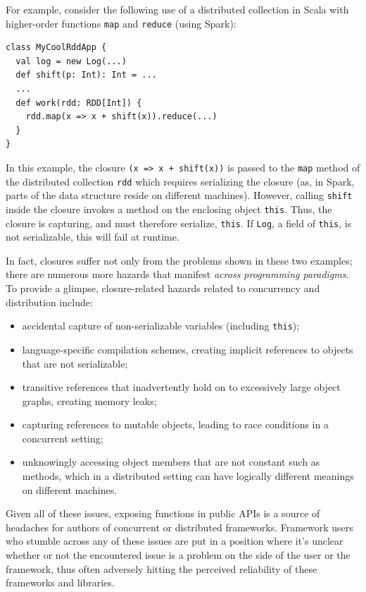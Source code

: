 \documentclass[runningheads]{llncs}
\begin{document}
\begin{sloppypar}
For example, consider the following use of a distributed collection in Scala
with higher-order functions \verb|map| and \verb|reduce| (using Spark):

\begin{lstlisting}
class MyCoolRddApp {
  val log = new Log(...)
  def shift(p: Int): Int = ...
  ...
  def work(rdd: RDD[Int]) {
    rdd.map(x => x + shift(x)).reduce(...)
  }
}
\end{lstlisting}
\noindent
In this example, the closure \verb|(x => x + shift(x))| is passed to the
\verb|map| method of the distributed collection \verb|rdd| which requires
serializing the closure (as, in Spark, parts of the data structure reside on
different machines). However, calling \verb|shift| inside the closure invokes
a method on the enclosing object \verb|this|. Thus, the closure is capturing,
and must therefore serialize, \verb|this|. If \verb|Log|, a field of
\verb|this|, is not serializable, this will fail at runtime.

In fact, closures suffer not only from the problems shown in these two
examples; there are numerous more hazards that manifest {\em across
programming paradigms}. To provide a glimpse, closure-related hazards
related to concurrency and distribution include:


\vspace{-2mm}
\begin{itemize}
\item accidental capture of non-serializable variables (including \verb|this|);
\item language-specific compilation schemes, creating implicit references to objects that are not serializable;
\item transitive references that inadvertently hold on to excessively large object graphs, creating memory leaks;
\item capturing references to mutable objects, leading to race conditions in a concurrent setting;
\item unknowingly accessing object members that are not constant such as methods, which in a distributed setting can have logically different meanings on different machines.
\end{itemize}

Given all of these issues, exposing functions in public APIs is a source of
headaches for authors of concurrent or distributed frameworks. Framework users
who stumble across any of these issues are put in a position where it's
unclear whether or not the encountered issue is a problem on the side of the
user or the framework, thus often adversely hitting the perceived reliability
of these frameworks and libraries.


\end{sloppypar}
\end{document}
